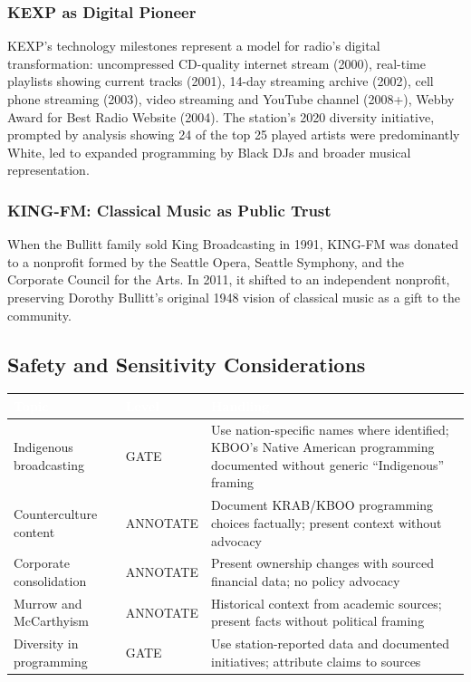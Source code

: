 \documentclass[11pt,letterpaper]{article}
\newcommand{\tableheader}[1]{\textbf{\sffamily\textcolor{white}{#1}}}
\begin{document}
\subsubsection{KEXP as Digital Pioneer}

KEXP's technology milestones represent a model for radio's digital transformation: uncompressed CD-quality internet stream (2000), real-time playlists showing current tracks (2001), 14-day streaming archive (2002), cell phone streaming (2003), video streaming and YouTube channel (2008+), Webby Award for Best Radio Website (2004). The station's 2020 diversity initiative, prompted by analysis showing 24 of the top 25 played artists were predominantly White, led to expanded programming by Black DJs and broader musical representation.

\subsubsection{KING-FM: Classical Music as Public Trust}

When the Bullitt family sold King Broadcasting in 1991, KING-FM was donated to a nonprofit formed by the Seattle Opera, Seattle Symphony, and the Corporate Council for the Arts. In 2011, it shifted to an independent nonprofit, preserving Dorothy Bullitt's original 1948 vision of classical music as a gift to the community.

\subsection{Safety and Sensitivity Considerations}

\begin{center}
\begin{tabularx}{\textwidth}{L{3.5cm}L{2cm}X}
\toprule
{}
\tableheader{Topic} & \tableheader{Level} & \tableheader{Handling} \\
\midrule
Indigenous broadcasting & GATE & Use nation-specific names where identified; KBOO's Native American programming documented without generic ``Indigenous'' framing \\
Counterculture content & ANNOTATE & Document KRAB/KBOO programming choices factually; present context without advocacy \\
Corporate consolidation & ANNOTATE & Present ownership changes with sourced financial data; no policy advocacy \\
Murrow and McCarthyism & ANNOTATE & Historical context from academic sources; present facts without political framing \\
Diversity in programming & GATE & Use station-reported data and documented initiatives; attribute claims to sources \\
\bottomrule
\end{tabularx}
\end{center}
\end{document}
